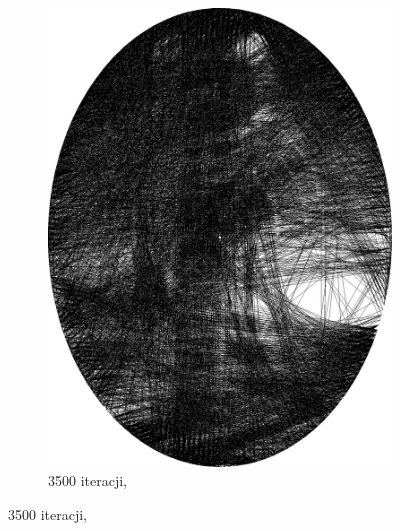 \begin{figure}[H]
\begin{subfigure}{0.19\textwidth}
            \includegraphics[width = \textwidth]{img/2-theory/aldrin/000mask-aldrin_ellipse_3500_threaded.png}
            \caption{3500 iteracji, }
            \label{theory-technics-mask-aldrin-threaded-e}
        \end{subfigure}
        

\end{figure}
